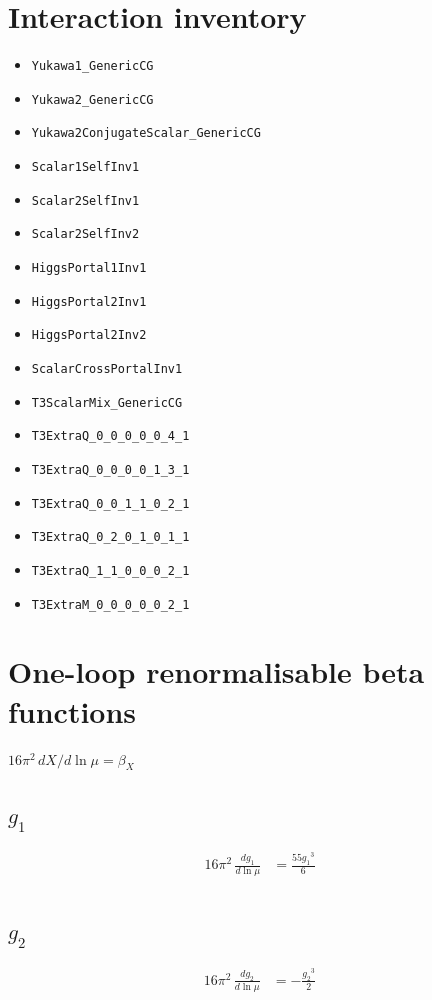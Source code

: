 \documentclass[10pt,a4paper]{article}
\begin{document}
\section*{Interaction inventory}
\begin{itemize}
\item \texttt{Yukawa1\_GenericCG}
\item \texttt{Yukawa2\_GenericCG}
\item \texttt{Yukawa2ConjugateScalar\_GenericCG}
\item \texttt{Scalar1SelfInv1}
\item \texttt{Scalar2SelfInv1}
\item \texttt{Scalar2SelfInv2}
\item \texttt{HiggsPortal1Inv1}
\item \texttt{HiggsPortal2Inv1}
\item \texttt{HiggsPortal2Inv2}
\item \texttt{ScalarCrossPortalInv1}
\item \texttt{T3ScalarMix\_GenericCG}
\item \texttt{T3ExtraQ\_0\_0\_0\_0\_0\_4\_1}
\item \texttt{T3ExtraQ\_0\_0\_0\_0\_1\_3\_1}
\item \texttt{T3ExtraQ\_0\_0\_1\_1\_0\_2\_1}
\item \texttt{T3ExtraQ\_0\_2\_0\_1\_0\_1\_1}
\item \texttt{T3ExtraQ\_1\_1\_0\_0\_0\_2\_1}
\item \texttt{T3ExtraM\_0\_0\_0\_0\_0\_2\_1}
\end{itemize}
\clearpage
\section*{One-loop renormalisable beta functions}
$16\pi^2\,dX/d\ln\mu=\beta_X$
\subsection*{$g_1$}
\begin{align*}
16\pi^2\,\frac{d g_1}{d\ln\mu} &=\frac{55 {g_1}^3}{6} \\
\end{align*}
\subsection*{$g_2$}
\begin{align*}
16\pi^2\,\frac{d g_2}{d\ln\mu} &=-\frac{{g_2}^3}{2} \\
\end{align*}
\end{document}
